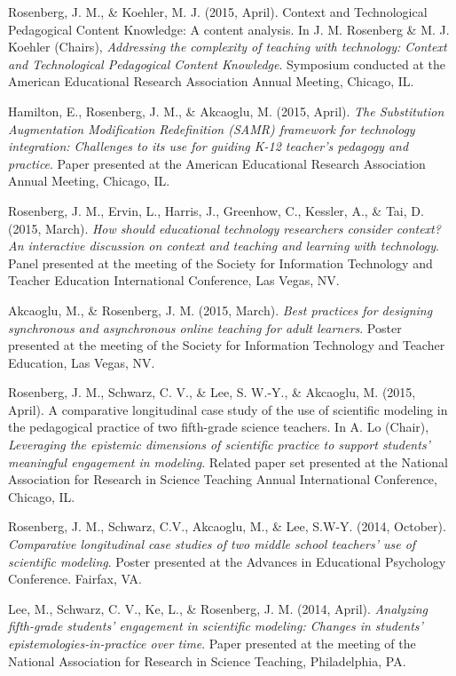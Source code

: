 \documentclass[14,]{article}
\begin{document}
Rosenberg, J. M., \& Koehler, M. J. (2015, April). Context and
Technological Pedagogical Content Knowledge: A content analysis. In J.
M. Rosenberg \& M. J. Koehler (Chairs), \emph{Addressing the complexity
of teaching with technology: Context and Technological Pedagogical
Content Knowledge}. Symposium conducted at the American Educational
Research Association Annual Meeting, Chicago, IL.

Hamilton, E., Rosenberg, J. M., \& Akcaoglu, M. (2015, April). \emph{The
Substitution Augmentation Modification Redefinition (SAMR) framework for
technology integration: Challenges to its use for guiding K-12 teacher's
pedagogy and practice}. Paper presented at the American Educational
Research Association Annual Meeting, Chicago, IL.

Rosenberg, J. M., Ervin, L., Harris, J., Greenhow, C., Kessler, A., \&
Tai, D. (2015, March). \emph{How should educational technology
researchers consider context? An interactive discussion on context and
teaching and learning with technology}. Panel presented at the meeting
of the Society for Information Technology and Teacher Education
International Conference, Las Vegas, NV.

Akcaoglu, M., \& Rosenberg, J. M. (2015, March). \emph{Best practices
for designing synchronous and asynchronous online teaching for adult
learners}. Poster presented at the meeting of the Society for
Information Technology and Teacher Education, Las Vegas, NV.

Rosenberg, J. M., Schwarz, C. V., \& Lee, S. W.-Y., \& Akcaoglu, M.
(2015, April). A comparative longitudinal case study of the use of
scientific modeling in the pedagogical practice of two fifth-grade
science teachers. In A. Lo (Chair), \emph{Leveraging the epistemic
dimensions of scientific practice to support students' meaningful
engagement in modeling}. Related paper set presented at the National
Association for Research in Science Teaching Annual International
Conference, Chicago, IL.

Rosenberg, J. M., Schwarz, C.V., Akcaoglu, M., \& Lee, S.W-Y. (2014,
October). \emph{Comparative longitudinal case studies of two middle
school teachers' use of scientific modeling}. Poster presented at the
Advances in Educational Psychology Conference. Fairfax, VA.

Lee, M., Schwarz, C. V., Ke, L., \& Rosenberg, J. M. (2014, April).
\emph{Analyzing fifth-grade students' engagement in scientific modeling:
Changes in students' epistemologies-in-practice over time}. Paper
presented at the meeting of the National Association for Research in
Science Teaching, Philadelphia, PA.
\end{document}
